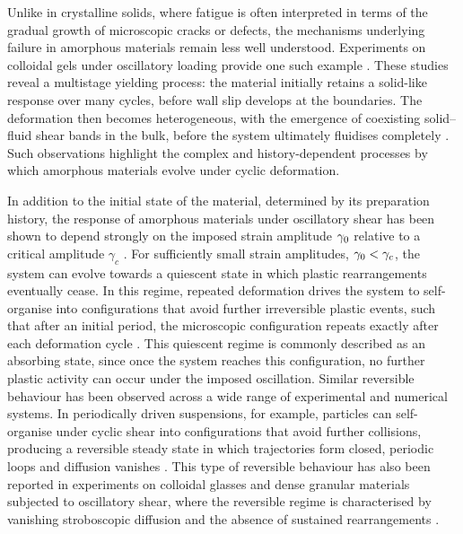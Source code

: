 Unlike in crystalline solids, where fatigue is often interpreted in terms of the gradual growth of microscopic cracks or defects, the mechanisms underlying failure in amorphous materials remain less well understood. Experiments on colloidal gels under oscillatory loading provide one such example \cite{Perge2014,Gibaud2016,SaintMichel2017}. These studies reveal a multistage yielding process: the material initially retains a solid-like response over many cycles, before wall slip develops at the boundaries. The deformation then becomes heterogeneous, with the emergence of coexisting solid–fluid shear bands in the bulk, before the system ultimately fluidises completely \cite{Gibaud2016}. Such observations highlight the complex and history-dependent processes by which amorphous materials evolve under cyclic deformation.

In addition to the initial state of the material, determined by its preparation history, the response of amorphous materials under oscillatory shear has been shown to depend strongly on the imposed strain amplitude $\gamma_0$ relative to a critical amplitude $\gamma_c$ \cite{bhaumikRoleAnnealingDetermining2021,Cort2008,Das2020,Fiocco2013,kawasakiMacroscopicYieldingJammed2016,KhirallahIntegerModel2021,knowltonMicroscopicViewYielding2014,kumarMappingOutGlassy2022,lavrentovichPeriodProliferationPeriodic2017,liuFateShearoscillatedAmorphous2022,munganMetastabilityMechanismYielding2021,himanagamanasaExperimentalSignaturesNonequilibrium2014,nessAbsorbingStateTransitionsGranular2020,pineChaosThresholdIrreversibility2005,priezjevMolecularDynamicsSimulations2018,Regev_onset_2013,sastryModelsYieldingBehavior2021,szulcForcedDeterministicDynamics2020,yehGlassStabilityChanges2020}. For sufficiently small strain amplitudes, $\gamma_0 < \gamma_c$, the system can evolve towards a quiescent state in which plastic rearrangements eventually cease. In this regime, repeated deformation drives the system to self-organise into configurations that avoid further irreversible plastic events, such that after an initial period, the microscopic configuration repeats exactly after each deformation cycle \cite{Regev_onset_2013,kawasakiMacroscopicYieldingJammed2016,Leishangthem2017}. This quiescent regime is commonly described as an absorbing state, since once the system reaches this configuration, no further plastic activity can occur under the imposed oscillation. Similar reversible behaviour has been observed across a wide range of experimental and numerical systems. In periodically driven suspensions, for example, particles can self-organise under cyclic shear into configurations that avoid further collisions, producing a reversible steady state in which trajectories form closed, periodic loops and diffusion vanishes \cite{pineChaosThresholdIrreversibility2005,Cort2008}. This type of reversible behaviour has also been reported in experiments on colloidal glasses and dense granular materials subjected to oscillatory shear, where the reversible regime is characterised by vanishing stroboscopic diffusion and the absence of sustained rearrangements \cite{himanagamanasaExperimentalSignaturesNonequilibrium2014,knowltonMicroscopicViewYielding2014}.

